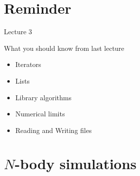 \documentclass[12pt,t]{beamer}
\title{\coursename}
\subtitle{Lecture 4: N-Body simulations, Structs, Classes, and generic functions}
\date {
 \tiny \url{\courseurl}
\vspace{2cm}
\doclicenseThis  
  
}
\begin{document}
 {
    \frame {
        \titlepage
    }
}

\frame{

\tableofcontents

}


\section{Reminder}

\begin{frame}{Lecture 3}
\begin{block}{What you should know from last lecture}
\begin{itemize}
\item Iterators
\item Lists
\item Library algorithms
\item Numerical limits
\item Reading and Writing files
\end{itemize}
\end{block}
\end{frame}


\section{$N$-body simulations}
\end{document}
